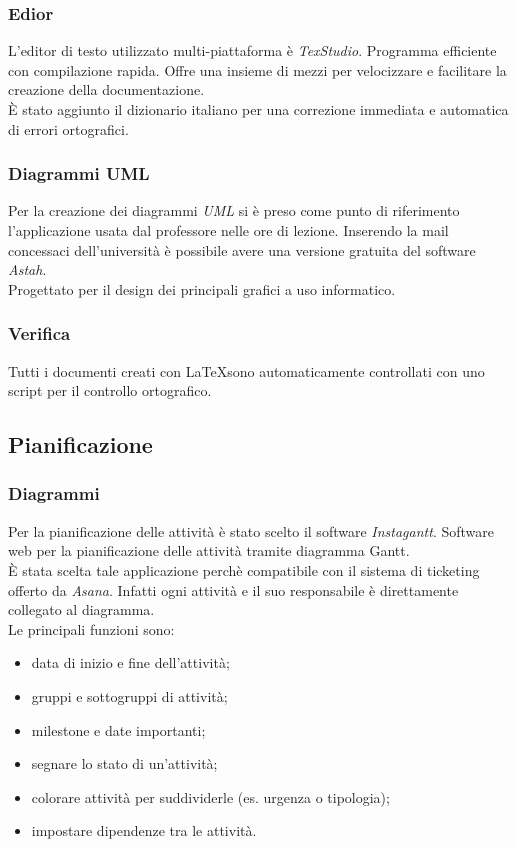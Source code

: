 \documentclass[12pt,a4paper,titlepage]{article}
\begin{document}
\subsubsection{Edior}
L'editor di testo utilizzato multi-piattaforma è \textit{TexStudio}. Programma efficiente con compilazione rapida. Offre una insieme di mezzi per velocizzare e facilitare la creazione della documentazione.\\
È stato aggiunto il dizionario italiano per una correzione immediata e automatica di errori ortografici.

\subsubsection{Diagrammi UML}
Per la creazione dei diagrammi \textit{UML} si è preso come punto di riferimento l'applicazione usata dal professore nelle ore di lezione. Inserendo la mail concessaci dell'università è possibile avere una versione gratuita del software \textit{Astah}.\\
Progettato per il design dei principali grafici a uso informatico.

\subsubsection{Verifica}
Tutti i documenti creati con \LaTeX sono automaticamente controllati con uno script per il controllo ortografico.

\subsection{Pianificazione}
\subsubsection{Diagrammi}
Per la pianificazione delle attività è stato scelto il software \textit{Instagantt}. Software web per la pianificazione delle attività tramite diagramma Gantt. \\
È stata scelta tale applicazione perchè compatibile con il sistema di ticketing offerto da \textit{Asana}. Infatti ogni attività e il suo responsabile è direttamente collegato al diagramma. \\
Le principali funzioni sono:
\begin{itemize}
	\item data di inizio e fine dell'attività;
	\item gruppi e sottogruppi di attività;
	\item milestone e date importanti;
	\item segnare lo stato di un'attività;
	\item colorare attività per suddividerle (es. urgenza o tipologia);
	\item impostare dipendenze tra le attività.
\end{itemize}
\end{document}

